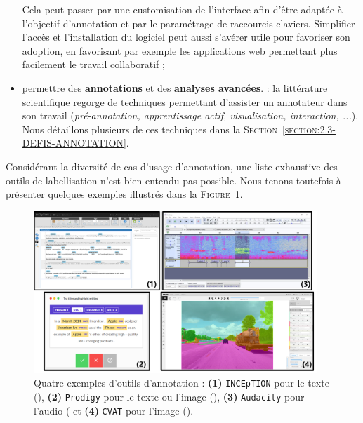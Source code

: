 \begin{itemize}
				Cela peut passer par une customisation de l'interface afin d'être adaptée à l'objectif d'annotation et par le paramétrage de raccourcis claviers.
				Simplifier l'accès et l'installation du logiciel peut aussi s'avérer utile pour favoriser son adoption, en favorisant par exemple les applications web permettant plus facilement le travail collaboratif ;
			\item permettre des \textbf{annotations} et des \textbf{analyses avancées}. :
				la littérature scientifique regorge de techniques permettant d'assister un annotateur dans son travail (\textit{pré-annotation, apprentissage actif, visualisation, interaction, ...}).
				Nous détaillons plusieurs de ces techniques dans la \textsc{Section~\ref{section:2.3-DEFIS-ANNOTATION}}.
		\end{itemize}
		
		Considérant la diversité de cas d'usage d'annotation, une liste exhaustive des outils de labellisation n'est bien entendu pas possible.
		Nous tenons toutefois à présenter quelques exemples illustrés dans la \textsc{Figure~\ref{figure:2.2.3-ORGANISATION-ANNOTATION-LOGICIELS}}.
		\begin{figure}[!htb]
			\centering
			\includegraphics[width=0.95\textwidth]{figures/etatdelart-logiciel-exemples}
			\caption{
				Quatre exemples d'outils d'annotation :
				\textbf{(1)} \texttt{INCEpTION} pour le texte (\cite{klie-etal:2018:inception-platform-machineassisted}),
				\textbf{(2)} \texttt{Prodigy} pour le texte ou l'image (\cite{montani-honnibal:2017:prodigy-modern-scriptable}),
				\textbf{(3)} \texttt{Audacity} pour l'audio (\cite{audacity-team:2000:audacity-free-audio}
				et \textbf{(4)} \texttt{CVAT} pour l'image (\cite{cvat.ai-corporation:2019:computer-vision-annotation}).
			}
			\label{figure:2.2.3-ORGANISATION-ANNOTATION-LOGICIELS}
		\end{figure}
		
